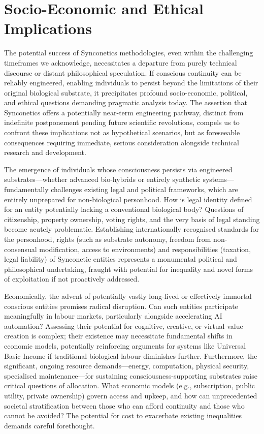 \documentclass[10pt]{article}
\begin{document}
\begin{sloppypar}
  \section{Socio-Economic and Ethical Implications}
  \label{sec:economics}

  The potential success of Synconetics methodologies, even within the challenging timeframes we acknowledge, necessitates a departure from purely technical discourse or distant philosophical speculation. If conscious continuity can be reliably engineered, enabling individuals to persist beyond the limitations of their original biological substrate, it precipitates profound socio-economic, political, and ethical questions demanding pragmatic analysis today. The assertion that Synconetics offers a potentially near-term engineering pathway, distinct from indefinite postponement pending future scientific revolutions, compels us to confront these implications not as hypothetical scenarios, but as foreseeable consequences requiring immediate, serious consideration alongside technical research and development.

  The emergence of individuals whose consciousness persists via engineered substrates—whether advanced bio-hybrids or entirely synthetic systems—fundamentally challenges existing legal and political frameworks, which are entirely unprepared for non-biological personhood. How is legal identity defined for an entity potentially lacking a conventional biological body? Questions of citizenship, property ownership, voting rights, and the very basis of legal standing become acutely problematic. Establishing internationally recognised standards for the personhood, rights (such as substrate autonomy, freedom from non-consensual modification, access to environments) and responsibilities (taxation, legal liability) of Synconetic entities represents a monumental political and philosophical undertaking, fraught with potential for inequality and novel forms of exploitation if not proactively addressed.

  Economically, the advent of potentially vastly long-lived or effectively immortal conscious entities promises radical disruption. Can such entities participate meaningfully in labour markets, particularly alongside accelerating AI automation? Assessing their potential for cognitive, creative, or virtual value creation is complex; their existence may necessitate fundamental shifts in economic models, potentially reinforcing arguments for systems like Universal Basic Income if traditional biological labour diminishes further. Furthermore, the significant, ongoing resource demands—energy, computation, physical security, specialised maintenance—for sustaining consciousness-supporting substrates raise critical questions of allocation. What economic models (e.g., subscription, public utility, private ownership) govern access and upkeep, and how can unprecedented societal stratification between those who can afford continuity and those who cannot be avoided? The potential for cost to exacerbate existing inequalities demands careful forethought.


\end{sloppypar}
\end{document}
